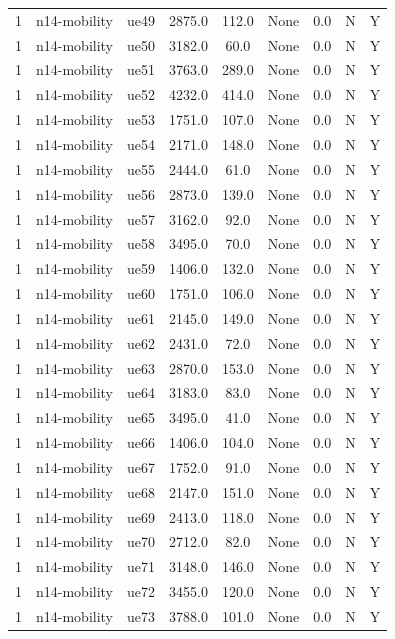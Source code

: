 \begin{table}[ht]
\begin{tabular}{|c|c|c|c|c|c|c|c|c|}
1 & n14-mobility & ue49 & 2875.0 & 112.0 & None & 0.0 & N & Y \\
1 & n14-mobility & ue50 & 3182.0 & 60.0 & None & 0.0 & N & Y \\
1 & n14-mobility & ue51 & 3763.0 & 289.0 & None & 0.0 & N & Y \\
1 & n14-mobility & ue52 & 4232.0 & 414.0 & None & 0.0 & N & Y \\
1 & n14-mobility & ue53 & 1751.0 & 107.0 & None & 0.0 & N & Y \\
1 & n14-mobility & ue54 & 2171.0 & 148.0 & None & 0.0 & N & Y \\
1 & n14-mobility & ue55 & 2444.0 & 61.0 & None & 0.0 & N & Y \\
1 & n14-mobility & ue56 & 2873.0 & 139.0 & None & 0.0 & N & Y \\
1 & n14-mobility & ue57 & 3162.0 & 92.0 & None & 0.0 & N & Y \\
1 & n14-mobility & ue58 & 3495.0 & 70.0 & None & 0.0 & N & Y \\
1 & n14-mobility & ue59 & 1406.0 & 132.0 & None & 0.0 & N & Y \\
1 & n14-mobility & ue60 & 1751.0 & 106.0 & None & 0.0 & N & Y \\
1 & n14-mobility & ue61 & 2145.0 & 149.0 & None & 0.0 & N & Y \\
1 & n14-mobility & ue62 & 2431.0 & 72.0 & None & 0.0 & N & Y \\
1 & n14-mobility & ue63 & 2870.0 & 153.0 & None & 0.0 & N & Y \\
1 & n14-mobility & ue64 & 3183.0 & 83.0 & None & 0.0 & N & Y \\
1 & n14-mobility & ue65 & 3495.0 & 41.0 & None & 0.0 & N & Y \\
1 & n14-mobility & ue66 & 1406.0 & 104.0 & None & 0.0 & N & Y \\
1 & n14-mobility & ue67 & 1752.0 & 91.0 & None & 0.0 & N & Y \\
1 & n14-mobility & ue68 & 2147.0 & 151.0 & None & 0.0 & N & Y \\
1 & n14-mobility & ue69 & 2413.0 & 118.0 & None & 0.0 & N & Y \\
1 & n14-mobility & ue70 & 2712.0 & 82.0 & None & 0.0 & N & Y \\
1 & n14-mobility & ue71 & 3148.0 & 146.0 & None & 0.0 & N & Y \\
1 & n14-mobility & ue72 & 3455.0 & 120.0 & None & 0.0 & N & Y \\
1 & n14-mobility & ue73 & 3788.0 & 101.0 & None & 0.0 & N & Y \\

\end{tabular}
\end{table}
